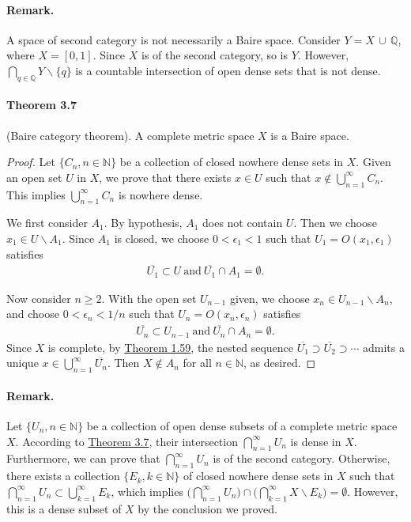 \documentclass{article}
\begin{document}
\paragraph{Remark.} A space of second category is not necessarily a Baire space. Consider $Y=X\,\cup\,\mathbb{Q}$, where $X=[0,1]$. Since $X$ is of the second category, so is $Y$. However, $\bigcap_{q\in\mathbb{Q}} Y\backslash\{q\}$ is a countable intersection of open dense sets that is not dense.

\paragraph{Theorem 3.7\label{thm:3.7}} (Baire category theorem). A complete metric space $X$ is a Baire space.
\begin{proof}
Let $\{C_n,n\in\mathbb{N}\}$ be a collection of closed nowhere dense sets in $X$. Given an open set $U$ in $X$, we prove that there exists $x\in U$ such that $x\notin\bigcup_{n=1}^\infty C_n$. This implies $\bigcup_{n=1}^\infty C_n$ is nowhere dense.

We first consider $A_1$. By hypothesis, $A_1$ does not contain $U$. Then we choose $x_1\in U\backslash A_1$. Since $A_1$ is closed, we choose $0<\epsilon_1<1$ such that $U_1=O(x_1,\epsilon_1)$ satisfies
\begin{align*}
\overline{U_1}\subset U\ \text{and}\ \overline{U_1}\cap A_1=\emptyset.
\end{align*}

Now consider $n\geq 2$. With the open set $U_{n-1}$ given, we choose $x_n\in U_{n-1}\backslash A_n$, and choose $0<\epsilon_n < 1/n$ such that $U_n=O(x_n,\epsilon_n)$ satisfies
\begin{align*}
	\overline{U_n}\subset U_{n-1}\ \text{and}\ \overline{U_n}\cap A_n=\emptyset.
\end{align*}
Since $X$ is complete, by \hyperref[thm:1.59]{Theorem 1.59}, the nested sequence $\overline{U_1}\supset\overline{U_2}\supset\cdots$ admits a unique $x\in\bigcup_{n=1}^\infty \overline{U_n}$. Then $X\notin A_n$ for all $n\in\mathbb{N}$, as desired.
\end{proof}
\paragraph{Remark.} Let $\{U_n,n\in\mathbb{N}\}$ be a collection of open dense subsets of a complete metric space $X$. According to \hyperref[thm:3.7]{Theorem 3.7}, their intersection $\bigcap_{n=1}^\infty U_n$ is dense in $X$. Furthermore, we can prove that $\bigcap_{n=1}^\infty U_n$ is of the second category. Otherwise, there exists a collection $\{E_k,k\in\mathbb{N}\}$ of closed nowhere dense sets in $X$ such that $\bigcap_{n=1}^\infty U_n\subset\bigcup_{k=1}^\infty E_k$, which implies $\bigl(\bigcap_{n=1}^\infty U_n\bigr)\cap\bigl(\bigcap_{k=1}^\infty X\backslash E_k\bigr)=\emptyset$. However, this is a dense subset of $X$ by the conclusion we proved.
\end{document}
